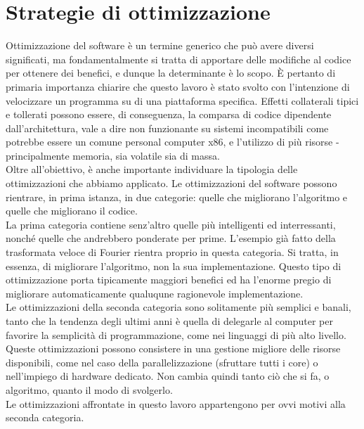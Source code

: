 \section{Strategie di ottimizzazione}
Ottimizzazione del software è un termine generico che può avere diversi 
significati, ma fondamentalmente si tratta di apportare delle modifiche al 
codice per ottenere dei benefici, e dunque la determinante è lo scopo. \`E 
pertanto di 
primaria importanza chiarire che 
questo lavoro è stato svolto con l'intenzione di velocizzare un programma su 
di una piattaforma specifica. Effetti collaterali tipici e tollerati possono 
essere, di conseguenza, la comparsa di codice dipendente dall'architettura, 
vale a dire non funzionante su sistemi incompatibili come potrebbe essere un 
comune 
personal computer x86, e l'utilizzo di più risorse - principalmente memoria, 
sia volatile sia di massa. \\
Oltre all'obiettivo, è anche importante individuare la tipologia delle 
ottimizzazioni 
che abbiamo applicato. Le ottimizzazioni del software possono 
rientrare, in prima istanza, in due 
categorie: quelle che migliorano l'algoritmo e quelle che migliorano il codice. 
\\La prima categoria contiene senz'altro quelle più intelligenti ed 
interressanti, nonché quelle che andrebbero ponderate per prime. L'esempio già 
fatto della trasformata veloce di Fourier rientra proprio in questa categoria. 
Si tratta, in essenza, di migliorare l'algoritmo, non la sua implementazione.
Questo tipo di ottimizzazione porta tipicamente maggiori benefici ed ha 
l'enorme pregio di migliorare automaticamente qualuqune ragionevole 
implementazione.
\\Le ottimizzazioni della seconda categoria sono solitamente più semplici e 
banali, tanto che la tendenza degli ultimi anni è quella di delegarle al 
computer per favorire la semplicità di programmazione, come nei linguaggi di 
più alto livello. Queste ottimizzazioni possono consistere in una gestione 
migliore delle risorse disponibili, come nel caso della parallelizzazione 
(sfruttare tutti i core) o nell'impiego di hardware dedicato.
Non cambia quindi tanto ciò che si fa, o algoritmo, quanto il modo di 
svolgerlo.\\
Le ottimizzazioni affrontate in questo lavoro appartengono per ovvi motivi alla 
seconda categoria.


